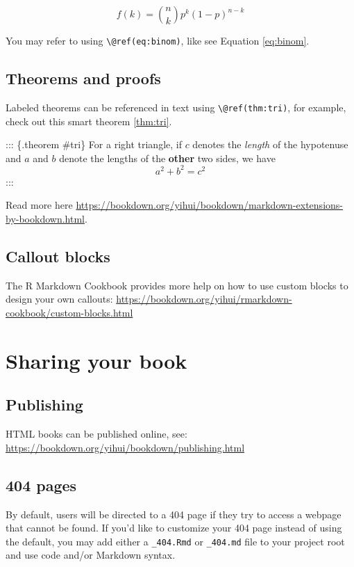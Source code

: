 \documentclass[]{book}
\begin{document}
\begin{equation} 
  f\left(k\right) = \binom{n}{k} p^k\left(1-p\right)^{n-k}
  \label{eq:binom}
\end{equation}

You may refer to using \texttt{\textbackslash{}@ref(eq:binom)}, like see
Equation \eqref{eq:binom}.

\section{Theorems and proofs}\label{theorems-and-proofs}

Labeled theorems can be referenced in text using
\texttt{\textbackslash{}@ref(thm:tri)}, for example, check out this
smart theorem \ref{thm:tri}.

::: \{.theorem \#tri\} For a right triangle, if \(c\) denotes the
\emph{length} of the hypotenuse and \(a\) and \(b\) denote the lengths
of the \textbf{other} two sides, we have \[a^2 + b^2 = c^2\] :::

Read more here
\url{https://bookdown.org/yihui/bookdown/markdown-extensions-by-bookdown.html}.

\section{Callout blocks}\label{callout-blocks}

The R Markdown Cookbook provides more help on how to use custom blocks
to design your own callouts:
\url{https://bookdown.org/yihui/rmarkdown-cookbook/custom-blocks.html}

\chapter{Sharing your book}\label{sharing-your-book}

\section{Publishing}\label{publishing}

HTML books can be published online, see:
\url{https://bookdown.org/yihui/bookdown/publishing.html}

\section{404 pages}\label{pages}

By default, users will be directed to a 404 page if they try to access a
webpage that cannot be found. If you'd like to customize your 404 page
instead of using the default, you may add either a \texttt{\_404.Rmd} or
\texttt{\_404.md} file to your project root and use code and/or Markdown
syntax.
\end{document}
